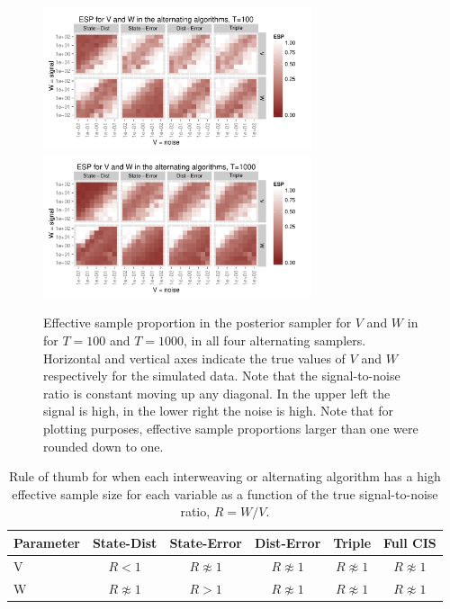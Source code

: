 \documentclass{article}
\begin{document}
\begin{figure}[!ht]
\centering
\includegraphics[width=0.7\textwidth]{plots/altESplot1}
\includegraphics[width=0.7\textwidth]{plots/altESplot2}
\caption{Effective sample proportion in the posterior sampler for $V$ and $W$ in for $T=100$ and $T=1000$, in all four alternating samplers. Horizontal and vertical axes indicate the true values of $V$ and $W$ respectively for the simulated data. Note that the signal-to-noise ratio is constant moving up any diagonal. In the upper left the signal is high, in the lower right the noise is high. Note that for plotting purposes, effective sample proportions larger than one were rounded down to one.}
\label{altESplot}
\end{figure}

\begin{table}
  \centering
  \begin{tabular}{|l|ccccc|}\hline
    Parameter & State-Dist        & State-Error       & Dist-Error        & Triple            & Full CIS \\\hline
    V         & $R < 1$           & $R \not\approx 1$ & $R \not\approx 1$ & $R \not\approx 1$ & $R \not\approx 1$ \\
    W         & $R \not\approx 1$ & $R > 1$           & $R \not\approx 1$ & $R \not\approx 1$ & $R \not\approx 1$\\\hline
  \end{tabular}
  \caption{Rule of thumb for when each interweaving or alternating algorithm has a high effective sample size for each variable as a function of the true signal-to-noise ratio, $R=W/V$.}
  \label{tab:stnmix2}
\end{table}
\end{document}
